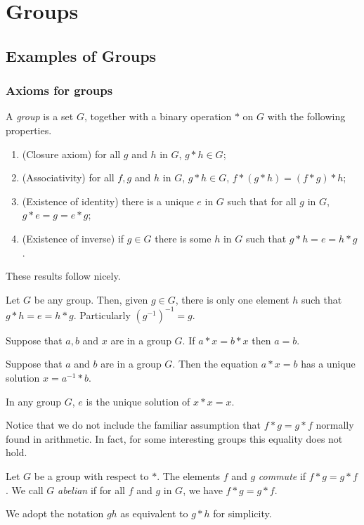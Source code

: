 \documentclass[main.tex]{subfiles}
\begin{document}
	\chapter{Groups}
		\section{Examples of Groups}
			\subsection{Axioms for groups}
				\begin{definition}
					A \textit{group}  is a set $G$, together with a binary operation $\ast$ on $G$ with the following properties.
					\begin{enumerate}
						\item (Closure axiom) for all $g$ and $h$ in $G$, $g \ast h \in G$;
						\item (Associativity) for all $f, g$ and $h$ in $G$, $g \ast h \in G$, $f\ast(g\ast h) = (f \ast g) \ast h$;
						\item (Existence of identity) there is a unique $e$ in $G$ such that for all $g$ in $G$, $g \ast e = g = e \ast g$;
						\item (Existence of inverse) if $g \in G$ there is some $h$ in $G$ such that $g \ast h = e = h \ast g$.
					\end{enumerate}
				\end{definition}
			These results follow nicely.
			\begin{lemma}
	Let $G$ be any group. Then, given $g \in G$, there is only one element $h$ such that $g \ast h = e = h \ast g $. Particularly $(g^{-1})^{-1} = g.$
			\end{lemma}
			\begin{lemma}
				Suppose that $a,b$ and $x$ are in a group $G$. If $a \ast x = b \ast x$ then $a = b$.
		\end{lemma}
				\begin{lemma}
		Suppose that $a$ and $b$ are in a group $G$. Then the equation $a \ast x = b$ has a unique solution $x = a^{-1} \ast b$.
	\end{lemma}
		\begin{lemma}
			In any group $G$, $e$ is the unique solution of $x \ast x = x$.
		\end{lemma}
		Notice that we do not include the familiar assumption that $f \ast g = g \ast f$ normally found in arithmetic. In fact, for some interesting groups this equality does not hold.
		\begin{definition}
			Let $G$ be a group with respect to $\ast$. The elements $f$ and $g$ \textit{commute} if $f \ast g = g \ast f$. We call $G$ \textit{abelian} if for all $f$ and $g$ in $G$, we have $f \ast g = g \ast f$.
		\end{definition}
		We adopt the notation $gh$ as equivalent to $g \ast h$ for simplicity.
		
\end{document}

